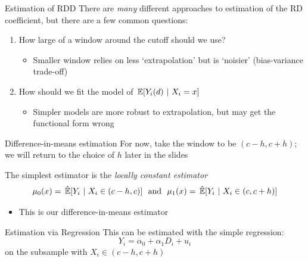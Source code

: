 \documentclass[aspectratio=169,t,11pt,table]{beamer}
\begin{document}
\begin{frame}{Estimation of RDD}
  There are \emph{many} different approaches to estimation of the RD coefficient, but there are a few common questions:
  \begin{enumerate}
    \item How large of a window around the cutoff should we use?
    \begin{itemize}
      \item Smaller window relies on less `extrapolation' but is `noisier' (bias-variance trade-off)
    \end{itemize}
    
    \item How should we fit the model of $\expec{Y_i(d)}{X_i = x}$
    \begin{itemize}
      \item Simpler models are more robust to extrapolation, but may get the functional form wrong
    \end{itemize}
  \end{enumerate}
\end{frame}


\begin{frame}{Difference-in-means estimation}{}
  For now, take the window to be $(c-h, c+h)$; we will return to the choice of $h$ later in the slides

  \bigskip
  The simplest estimator is the \emph{locally constant estimator}
  $$
    \mu_0(x) = \expechat{Y_i}{X_i \in (c-h, c)} \ \text{ and }\ \mu_1(x) = \expechat{Y_i}{X_i \in (c, c+h)}
  $$
  \begin{itemize}
    \item This is our difference-in-means estimator
  \end{itemize}
\end{frame}

\begin{frame}{Estimation via Regression}{}
  This can be estimated with the simple regression:
  $$
    Y_i = \alpha_0 + \alpha_1 D_i + u_i
  $$
  on the subsample with $X_i \in (c-h, c+h)$
\end{frame}

\end{document}
